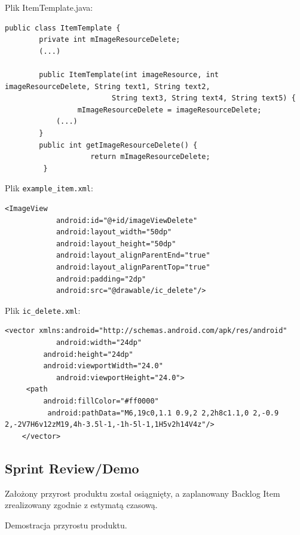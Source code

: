 \documentclass[a4paper]{article}
\begin{document}
Plik ItemTemplate.java:
\begin{lstlisting}[style=java]
	public class ItemTemplate {
		private int mImageResourceDelete;
		(...)
		
		public ItemTemplate(int imageResource, int imageResourceDelete, String text1, String text2,
                       	 String text3, String text4, String text5) {
       			 mImageResourceDelete = imageResourceDelete;
			(...)
		}
		public int getImageResourceDelete() {
        			return mImageResourceDelete;
   		 }
\end{lstlisting}

Plik \verb!example_item.xml!:
\begin{lstlisting}[style=xml]
	 <ImageView
            android:id="@+id/imageViewDelete"
            android:layout_width="50dp"
            android:layout_height="50dp"
            android:layout_alignParentEnd="true"
            android:layout_alignParentTop="true"
            android:padding="2dp"
            android:src="@drawable/ic_delete"/>
\end{lstlisting}

Plik \verb!ic_delete.xml!:
\begin{lstlisting}[style=xml]
	<vector xmlns:android="http://schemas.android.com/apk/res/android"
        	android:width="24dp"
       	 android:height="24dp"
       	 android:viewportWidth="24.0"
        	android:viewportHeight="24.0">
   	 <path
       	 android:fillColor="#ff0000"
      	  android:pathData="M6,19c0,1.1 0.9,2 2,2h8c1.1,0 2,-0.9 2,-2V7H6v12zM19,4h-3.5l-1,-1h-5l-1,1H5v2h14V4z"/>
	</vector>
\end{lstlisting}


\subsection{Sprint Review/Demo}
\par Założony przyrost produktu został osiągnięty, a zaplanowany Backlog Item zrealizowany zgodnie z estymatą czasową. 
\par Demostracja przyrostu produktu.
\end{document}
